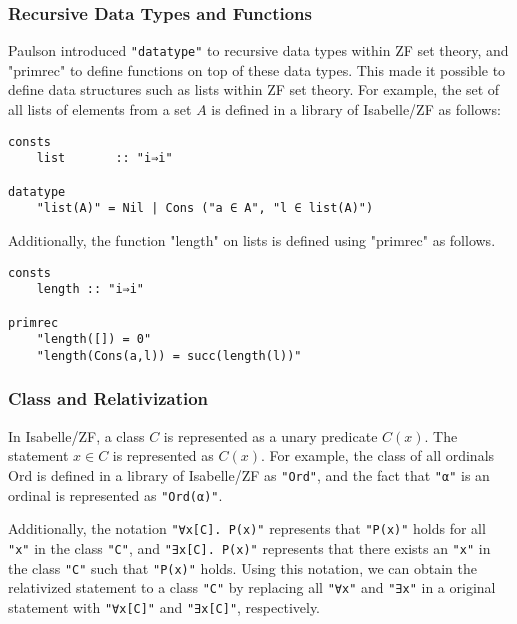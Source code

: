 \documentclass{report}
\newenvironment{isaframe}{\begin{mdframed}[topline=false, rightline=false, bottomline=false]}{\end{mdframed}}
\begin{document}
\subsubsection{Recursive Data Types and Functions}
Paulson \cite{paulson_datatype_impl} introduced \texttt{"datatype"} to recursive data types within ZF set theory, 
and "primrec" to define functions on top of these data types. 
This made it possible to define data structures such as lists within ZF set theory.
For example, the set of all lists of elements from a set $A$ is defined in a library of Isabelle/ZF as follows:
\begin{isaframe}
\begin{verbatim}
consts
    list       :: "i⇒i"

datatype
    "list(A)" = Nil | Cons ("a ∈ A", "l ∈ list(A)")
\end{verbatim}
\end{isaframe}
Additionally, the function "length" on lists is defined using "primrec" as follows.
\begin{isaframe}
\begin{verbatim}
consts
    length :: "i⇒i"

primrec
    "length([]) = 0"
    "length(Cons(a,l)) = succ(length(l))"
\end{verbatim}
\end{isaframe}


\subsubsection{Class and Relativization}
In Isabelle/ZF, a class $C$ is represented as a unary predicate $C(x)$.
The statement $x \in C$ is represented as $C(x)$.
For example, the class of all ordinals $\mathrm{Ord}$ is defined in a library of Isabelle/ZF as \texttt{"Ord"},
and the fact that \texttt{"α"} is an ordinal is represented as \texttt{"Ord(α)"}.

Additionally, the notation \texttt{"∀x[C]. P(x)"} represents that \texttt{"P(x)"} holds for all \texttt{"x"} in the class \texttt{"C"},
and \texttt{"∃x[C]. P(x)"} represents that there exists an \texttt{"x"} in the class \texttt{"C"} such that \texttt{"P(x)"} holds.
Using this notation, we can obtain the relativized statement to a class \texttt{"C"} 
by replacing all \texttt{"∀x"} and \texttt{"∃x"} in a original statement with \texttt{"∀x[C]"} and \texttt{"∃x[C]"}, respectively.
\end{document}
